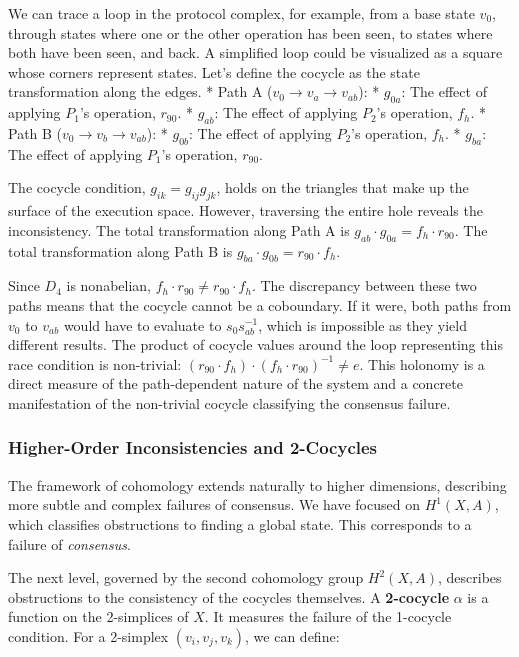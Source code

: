 \documentclass[
]{article}
\begin{document}
We can trace a loop in the protocol complex, for example, from a base
state \(v_0\), through states where one or the other operation has been
seen, to states where both have been seen, and back. A simplified loop
could be visualized as a square whose corners represent states. Let's
define the cocycle as the state transformation along the edges. * Path A
(\(v_0 \to v_a \to v_{ab}\)): * \(g_{0a}\): The effect of applying
\(P_1\)'s operation, \(r_{90}\). * \(g_{ab}\): The effect of applying
\(P_2\)'s operation, \(f_h\). * Path B (\(v_0 \to v_b \to v_{ab}\)): *
\(g_{0b}\): The effect of applying \(P_2\)'s operation, \(f_h\). *
\(g_{ba}\): The effect of applying \(P_1\)'s operation, \(r_{90}\).

The cocycle condition, \(g_{ik} = g_{ij}g_{jk}\), holds on the triangles
that make up the surface of the execution space. However, traversing the
entire hole reveals the inconsistency. The total transformation along
Path A is \(g_{ab} \cdot g_{0a} = f_h \cdot r_{90}\). The total
transformation along Path B is
\(g_{ba} \cdot g_{0b} = r_{90} \cdot f_h\).

Since \(D_4\) is nonabelian, \(f_h \cdot r_{90} \neq r_{90} \cdot f_h\).
The discrepancy between these two paths means that the cocycle cannot be
a coboundary. If it were, both paths from \(v_0\) to \(v_{ab}\) would
have to evaluate to \(s_0 s_{ab}^{-1}\), which is impossible as they
yield different results. The product of cocycle values around the loop
representing this race condition is non-trivial:
\((r_{90} \cdot f_h) \cdot (f_h \cdot r_{90})^{-1} \neq e\). This
holonomy is a direct measure of the path-dependent nature of the system
and a concrete manifestation of the non-trivial cocycle classifying the
consensus failure.

\subsubsection{Higher-Order Inconsistencies and
2-Cocycles}\label{higher-order-inconsistencies-and-2-cocycles}

The framework of cohomology extends naturally to higher dimensions,
describing more subtle and complex failures of consensus. We have
focused on \(H^1(X, A)\), which classifies obstructions to finding a
global state. This corresponds to a failure of \emph{consensus}.

The next level, governed by the second cohomology group \(H^2(X, A)\),
describes obstructions to the consistency of the cocycles themselves. A
\textbf{2-cocycle} \(\alpha\) is a function on the 2-simplices of \(X\).
It measures the failure of the 1-cocycle condition. For a 2-simplex
\((v_i, v_j, v_k)\), we can define:
\end{document}
